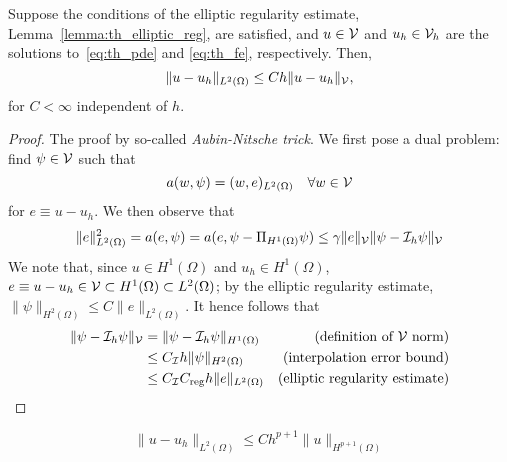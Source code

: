 \begin{theorem}
  Suppose the conditions of the elliptic regularity estimate, Lemma~\ref{lemma:th_elliptic_reg}, are satisfied, and $u \in \mathcal{V}$ and $u_h \in \mathcal{V}_h$ are the solutions to~\eqref{eq:th_pde} and \eqref{eq:th_fe}, respectively. Then, 
  \begin{equation*}
    \| u - u_h \|_{L^2(\Omega)} \leq C h \| u-u_h \|_{\mathcal{V}},
  \end{equation*}
  for $C < \infty$ independent of $h$.
  \begin{proof}
    The proof by so-called \emph{Aubin-Nitsche trick}. We first pose a dual problem: find $\psi \in \mathcal{V}$ such that
    \begin{equation*}
      a(w,\psi) = (w,e)_{L^2(\Omega)} \quad \forall w \in \mathcal{V}
    \end{equation*}
    for $e \equiv u - u_h$. We then observe that
    \begin{equation*}
      \| e \|_{L^2(\Omega)}^2 = a(e, \psi)
      = a(e, \psi - \Pi_{H^1(\Omega)} \psi)
      \leq \gamma \| e \|_{\mathcal{V}} \| \psi - \mathcal{I}_h \psi \|_{\mathcal{V}}
    \end{equation*}
    We note that, since $u \in H^1(\Omega)$ and $u_h \in H^1(\Omega)$,  $e \equiv u - u_h \in \mathcal{V} \subset H^1(\Omega) \subset L^2(\Omega)$; by the elliptic regularity estimate, $\| \psi \|_{H^2(\Omega)} \leq C \| e \|_{L^2(\Omega)}$. It hence follows that
    \begin{align*}
      \| \psi - \mathcal{I}_h \psi \|_{\mathcal{V}}
      &=\| \psi - \mathcal{I}_h \psi \|_{H^1(\Omega)} & \text{(definition of $\mathcal{V}$ norm)} \\
      &\leq C_{\mathcal{I}} h \| \psi \|_{H^2(\Omega)} & \text{(interpolation error bound)}\\
      &\leq C_{\mathcal{I}} C_{\rm reg} h  \| e \|_{L^2(\Omega)} & \text{(elliptic regularity estimate)}
    \end{align*}
  \end{proof}
\end{theorem}

\begin{corollary}
  
  \begin{equation*}
    \| u - u_h \|_{L^2(\Omega)} \leq C h^{p+1} \| u \|_{H^{p+1}(\Omega)}
  \end{equation*}
\end{corollary}

